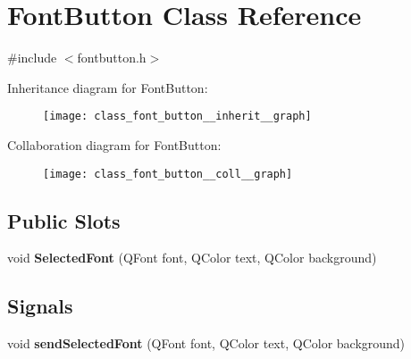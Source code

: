 \section{Font\+Button Class Reference}
\label{class_font_button}


{\ttfamily \#include $<$fontbutton.\+h$>$}



Inheritance diagram for Font\+Button\+:\nopagebreak
\begin{figure}[H]
\begin{center}
\leavevmode
\texttt{[image: class\_font\_button\_\_inherit\_\_graph]}
\end{center}
\end{figure}


Collaboration diagram for Font\+Button\+:\nopagebreak
\begin{figure}[H]
\begin{center}
\leavevmode
\texttt{[image: class\_font\_button\_\_coll\_\_graph]}
\end{center}
\end{figure}
\subsection*{Public Slots}
\begin{DoxyCompactItemize}
\item 
void \textbf{ Selected\+Font} (Q\+Font font, Q\+Color text, Q\+Color background)
\end{DoxyCompactItemize}
\subsection*{Signals}
\begin{DoxyCompactItemize}
\item 
void \textbf{ send\+Selected\+Font} (Q\+Font font, Q\+Color text, Q\+Color background)
\end{DoxyCompactItemize}

